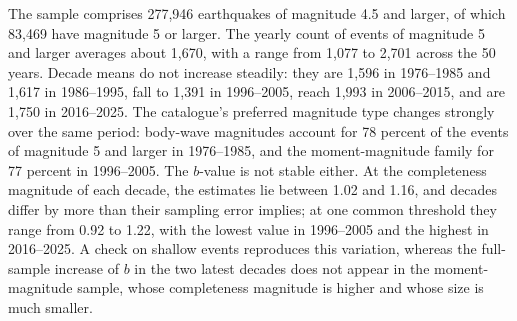 \documentclass[11pt]{article}
\begin{document}
The sample comprises 277,946 earthquakes of magnitude 4.5 and larger, of which 83,469 have magnitude 5 or larger.
The yearly count of events of magnitude 5 and larger averages about 1,670, with a range from 1,077 to 2,701 across the 50 years.
Decade means do not increase steadily: they are 1,596 in 1976--1985 and 1,617 in 1986--1995, fall to 1,391 in 1996--2005, reach 1,993 in 2006--2015, and are 1,750 in 2016--2025.
The catalogue's preferred magnitude type changes strongly over the same period: body-wave magnitudes account for 78 percent of the events of magnitude 5 and larger in 1976--1985, and the moment-magnitude family for 77 percent in 1996--2005.
The $b$-value is not stable either. At the completeness magnitude of each decade, the estimates lie between 1.02 and 1.16, and decades differ by more than their sampling error implies; at one common threshold they range from 0.92 to 1.22, with the lowest value in 1996--2005 and the highest in 2016--2025.
A check on shallow events reproduces this variation, whereas the full-sample increase of $b$ in the two latest decades does not appear in the moment-magnitude sample, whose completeness magnitude is higher and whose size is much smaller.
\end{document}
